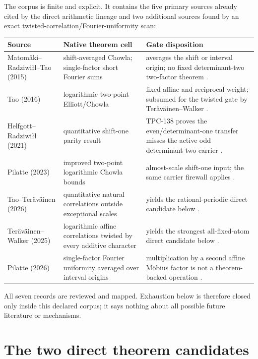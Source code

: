 \documentclass[11pt]{article}
\begin{document}
The corpus is finite and explicit.  It contains the five primary sources
already cited by the direct arithmetic lineage and two additional sources
found by an exact twisted-correlation/Fourier-uniformity scan:
\begin{center}
\small
\begin{tabularx}{\textwidth}{@{}p{}p{}Y@{}}
\toprule
Source & Native theorem cell & Gate disposition\\
\midrule
Matom\"aki--Radziwi{\l}{\l}--Tao (2015)
& shift-averaged Chowla; single-factor short Fourier sums
& averages the shift or interval origin; no fixed determinant-two
  two-factor theorem \citep{MatomakiRadziwillTao2015}.\\
Tao (2016)
& logarithmic two-point Elliott/Chowla
& fixed affine and reciprocal weight; subsumed for the twisted gate by
  Ter\"av\"ainen--Walker \citep{Tao2016}.\\
Helfgott--Radziwi{\l}{\l} (2021)
& quantitative shift-one parity result
& TPC-138 proves the even/determinant-one transfer misses the active odd
  determinant-two carrier \citep{HelfgottRadziwill2021,WangTPC138}.\\
Pilatte (2023)
& improved two-point logarithmic Chowla bounds
& almost-scale shift-one input; the same carrier firewall applies
  \citep{Pilatte2023,WangTPC138}.\\
Tao--Ter\"av\"ainen (2026)
& quantitative natural correlations outside exceptional scales
& yields the rational-periodic direct candidate below
  \citep{TaoTeravainen2026}.\\
Ter\"av\"ainen--Walker (2025)
& logarithmic affine correlations twisted by every additive character
& yields the strongest all-fixed-atom direct candidate below
  \citep{TeravainenWalker2025}.\\
Pilatte (2026)
& single-factor Fourier uniformity averaged over interval origins
& multiplication by a second affine M\"obius factor is not a
  theorem-backed operation \citep{Pilatte2026}.\\
\bottomrule
\end{tabularx}
\end{center}
All seven records are reviewed and mapped.  Exhaustion below is therefore
closed only inside this declared corpus; it says nothing about all possible
future literature or mechanisms.

\section{The two direct theorem candidates}
\end{document}
